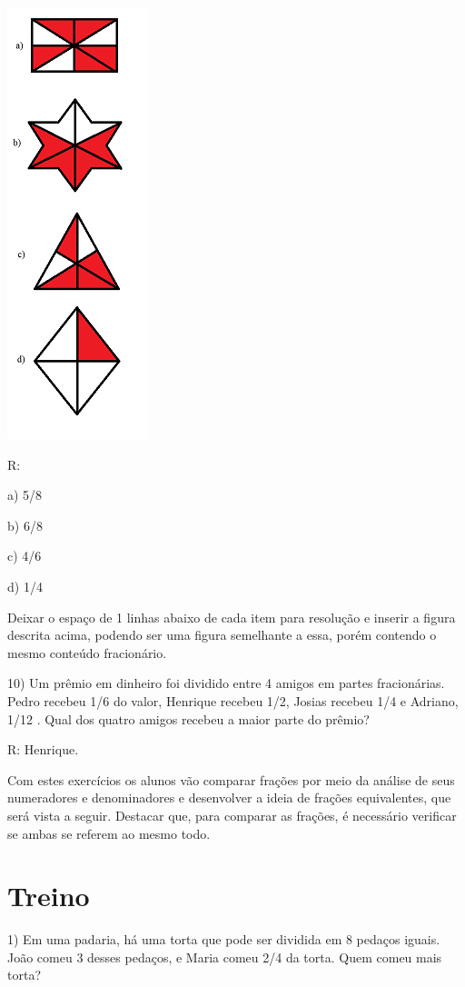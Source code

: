 \includegraphics[width=1.61458in,height=4.94792in]{./imgSAEB_6_MAT/media/image34.png}

R:

a) 5/8

b) 6/8

c) 4/6

d) 1/4

Deixar o espaço de 1 linhas abaixo de cada item para resolução e inserir
a figura descrita acima, podendo ser uma figura semelhante a essa, porém
contendo o mesmo conteúdo fracionário.

10) Um prêmio em dinheiro foi dividido entre 4 amigos em partes
fracionárias. Pedro recebeu 1/6 do valor, Henrique recebeu 1/2, Josias
recebeu 1/4 e Adriano, 1/12 . Qual dos quatro amigos recebeu a maior
parte do prêmio?

R: Henrique.

Com estes exercícios os alunos vão comparar frações por meio da análise
de seus numeradores e denominadores e desenvolver a ideia de frações
equivalentes, que será vista a seguir. Destacar que, para comparar as
frações, é necessário verificar se ambas se referem ao mesmo todo.

\section{Treino}

1) Em uma padaria, há uma torta que pode ser dividida em 8 pedaços
iguais. João comeu 3 desses pedaços, e Maria comeu 2/4 da torta. Quem
comeu mais torta?

